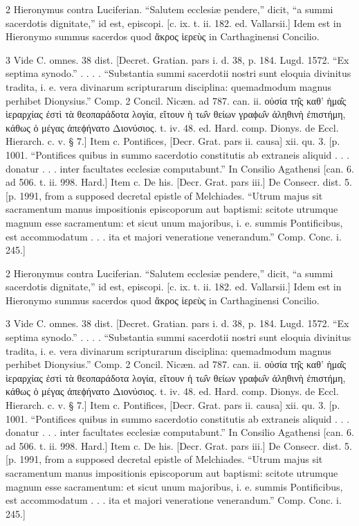 2
Hieronymus contra Luciferian. “Salutem ecclesiæ pendere,” dicit, “a summi sacerdotis dignitate,” id est, episcopi. [c. ix. t. ii. 182. ed. Vallarsii.] Idem est in Hieronymo summus sacerdos quod ἄκρος ἱερεὺς in Carthaginensi Concilio.

3
Vide C. omnes. 38 dist. [Decret. Gratian. pars i. d. 38, p. 184. Lugd. 1572. “Ex septima synodo.” . . . . “Substantia summi sacerdotii nostri sunt eloquia divinitus tradita, i. e. vera divinarum scripturarum disciplina: quemadmodum magnus perhibet Dionysius.” Comp. 2 Concil. Nicæn. ad 787. can. ii. οὐσία τη̑ς καθ’ ἡμα̑ς ἱεραρχίας ἐστὶ τὰ θεοπαράδοτα λογία, εἴτουν ἡ τω̑ν θείων γραϕω̑ν ἀληθινὴ ἐπιστήμη, κάθως ὁ μέγας ἀπεϕήνατο Διονύσιος. t. iv. 48. ed. Hard. comp. Dionys. de Eccl. Hierarch. c. v. § 7.] Item c. Pontifices, [Decr. Grat. pars ii. causa] xii. qu. 3. [p. 1001. “Pontifices quibus in summo sacerdotio constitutis ab extraneis aliquid . . . donatur . . . inter facultates ecclesiæ computabunt.” In Consilio Agathensi [can. 6. ad 506. t. ii. 998. Hard.] Item c. De his. [Decr. Grat. pars iii.] De Consecr. dist. 5. [p. 1991, from a supposed decretal epistle of Melchiades. “Utrum majus sit sacramentum manus impositionis episcoporum aut baptismi: scitote utrumque magnum esse sacramentum: et sicut unum majoribus, i. e. summis Pontificibus, est accommodatum . . . ita et majori veneratione venerandum.” Comp. Conc. i. 245.]

2
Hieronymus contra Luciferian. “Salutem ecclesiæ pendere,” dicit, “a summi sacerdotis dignitate,” id est, episcopi. [c. ix. t. ii. 182. ed. Vallarsii.] Idem est in Hieronymo summus sacerdos quod ἄκρος ἱερεὺς in Carthaginensi Concilio.

3
Vide C. omnes. 38 dist. [Decret. Gratian. pars i. d. 38, p. 184. Lugd. 1572. “Ex septima synodo.” . . . . “Substantia summi sacerdotii nostri sunt eloquia divinitus tradita, i. e. vera divinarum scripturarum disciplina: quemadmodum magnus perhibet Dionysius.” Comp. 2 Concil. Nicæn. ad 787. can. ii. οὐσία τη̑ς καθ’ ἡμα̑ς ἱεραρχίας ἐστὶ τὰ θεοπαράδοτα λογία, εἴτουν ἡ τω̑ν θείων γραϕω̑ν ἀληθινὴ ἐπιστήμη, κάθως ὁ μέγας ἀπεϕήνατο Διονύσιος. t. iv. 48. ed. Hard. comp. Dionys. de Eccl. Hierarch. c. v. § 7.] Item c. Pontifices, [Decr. Grat. pars ii. causa] xii. qu. 3. [p. 1001. “Pontifices quibus in summo sacerdotio constitutis ab extraneis aliquid . . . donatur . . . inter facultates ecclesiæ computabunt.” In Consilio Agathensi [can. 6. ad 506. t. ii. 998. Hard.] Item c. De his. [Decr. Grat. pars iii.] De Consecr. dist. 5. [p. 1991, from a supposed decretal epistle of Melchiades. “Utrum majus sit sacramentum manus impositionis episcoporum aut baptismi: scitote utrumque magnum esse sacramentum: et sicut unum majoribus, i. e. summis Pontificibus, est accommodatum . . . ita et majori veneratione venerandum.” Comp. Conc. i. 245.]

